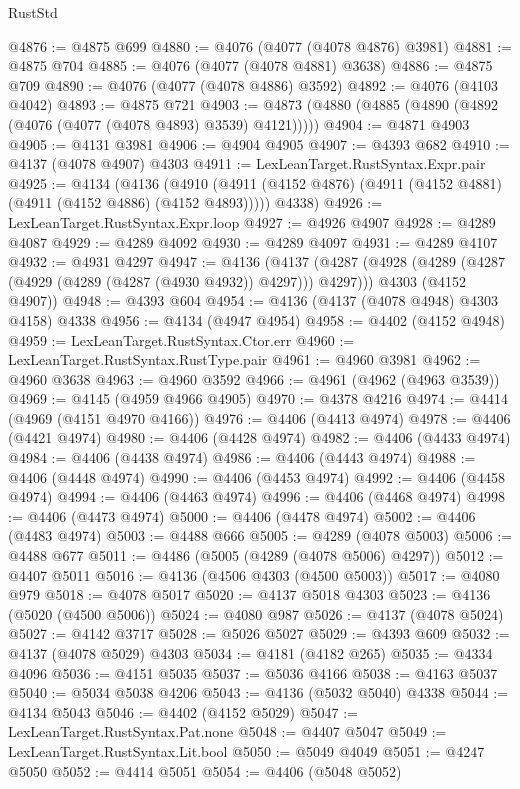 \begin{lexlean}{RustStd}
\begin{coremodule}
{\begin{coremodule}
{{{{{{{{{{{{{{{{{{{{{{{{{{{{{{{{{{{{{{{{{{{{{{{{{{@4876 := @4875 @699
@4880 := @4076 (@4077 (@4078 @4876) @3981)
@4881 := @4875 @704
@4885 := @4076 (@4077 (@4078 @4881) @3638)
@4886 := @4875 @709
@4890 := @4076 (@4077 (@4078 @4886) @3592)
@4892 := @4076 (@4103 @4042)
@4893 := @4875 @721
@4903 := @4873 (@4880 (@4885 (@4890 (@4892 (@4076 (@4077 (@4078 @4893) @3539) @4121)))))
@4904 := @4871 @4903
@4905 := @4131 @3981
@4906 := @4904 @4905
@4907 := @4393 @682
@4910 := @4137 (@4078 @4907) @4303
@4911 := LexLeanTarget.RustSyntax.Expr.pair
@4925 := @4134
    (@4136
      (@4910 (@4911 (@4152 @4876) (@4911 (@4152 @4881) (@4911 (@4152 @4886) (@4152 @4893)))))
      @4338)
@4926 := LexLeanTarget.RustSyntax.Expr.loop
@4927 := @4926 @4907
@4928 := @4289 @4087
@4929 := @4289 @4092
@4930 := @4289 @4097
@4931 := @4289 @4107
@4932 := @4931 @4297
@4947 := @4136
    (@4137
      (@4287 (@4928 (@4289 (@4287 (@4929 (@4289 (@4287 (@4930 @4932)) @4297))) @4297)))
      @4303
      (@4152 @4907))
@4948 := @4393 @604
@4954 := @4136 (@4137 (@4078 @4948) @4303 @4158) @4338
@4956 := @4134 (@4947 @4954)
@4958 := @4402 (@4152 @4948)
@4959 := LexLeanTarget.RustSyntax.Ctor.err
@4960 := LexLeanTarget.RustSyntax.RustType.pair
@4961 := @4960 @3981
@4962 := @4960 @3638
@4963 := @4960 @3592
@4966 := @4961 (@4962 (@4963 @3539))
@4969 := @4145 (@4959 @4966 @4905)
@4970 := @4378 @4216
@4974 := @4414 (@4969 (@4151 @4970 @4166))
@4976 := @4406 (@4413 @4974)
@4978 := @4406 (@4421 @4974)
@4980 := @4406 (@4428 @4974)
@4982 := @4406 (@4433 @4974)
@4984 := @4406 (@4438 @4974)
@4986 := @4406 (@4443 @4974)
@4988 := @4406 (@4448 @4974)
@4990 := @4406 (@4453 @4974)
@4992 := @4406 (@4458 @4974)
@4994 := @4406 (@4463 @4974)
@4996 := @4406 (@4468 @4974)
@4998 := @4406 (@4473 @4974)
@5000 := @4406 (@4478 @4974)
@5002 := @4406 (@4483 @4974)
@5003 := @4488 @666
@5005 := @4289 (@4078 @5003)
@5006 := @4488 @677
@5011 := @4486 (@5005 (@4289 (@4078 @5006) @4297))
@5012 := @4407 @5011
@5016 := @4136 (@4506 @4303 (@4500 @5003))
@5017 := @4080 @979
@5018 := @4078 @5017
@5020 := @4137 @5018 @4303
@5023 := @4136 (@5020 (@4500 @5006))
@5024 := @4080 @987
@5026 := @4137 (@4078 @5024)
@5027 := @4142 @3717
@5028 := @5026 @5027
@5029 := @4393 @609
@5032 := @4137 (@4078 @5029) @4303
@5034 := @4181 (@4182 @265)
@5035 := @4334 @4096
@5036 := @4151 @5035
@5037 := @5036 @4166
@5038 := @4163 @5037
@5040 := @5034 @5038 @4206
@5043 := @4136 (@5032 @5040) @4338
@5044 := @4134 @5043
@5046 := @4402 (@4152 @5029)
@5047 := LexLeanTarget.RustSyntax.Pat.none
@5048 := @4407 @5047
@5049 := LexLeanTarget.RustSyntax.Lit.bool
@5050 := @5049 @4049
@5051 := @4247 @5050
@5052 := @4414 @5051
@5054 := @4406 (@5048 @5052)
}}}}}}}}}}}}}}}}}}}}}}}}}}}}}}}}}}}}}}}}}}}}}}}}}}
\end{coremodule}}
\end{coremodule}
\end{lexlean}
